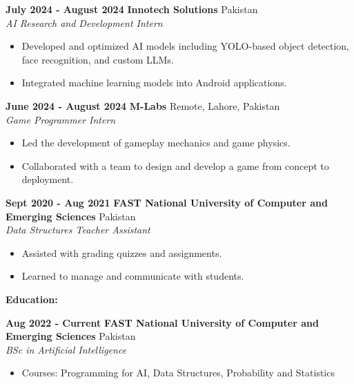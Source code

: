 \documentclass[a4paper,10pt]{article}
\begin{document}
\textbf{July 2024 - August 2024} \hfill \textbf{Innotech Solutions} \hfill Pakistan\\
\textit{AI Research and Development Intern}
\begin{itemize}
    \item Developed and optimized AI models including YOLO-based object detection, face recognition, and custom LLMs.
    \item Integrated machine learning models into Android applications.
\end{itemize}

\vspace{5pt}

\textbf{June 2024 - August 2024} \hfill \textbf{M-Labs} \hfill Remote, Lahore, Pakistan\\
\textit{Game Programmer Intern}
\begin{itemize}
    \item Led the development of gameplay mechanics and game physics.
    \item Collaborated with a team to design and develop a game from concept to deployment.
\end{itemize}

\vspace{5pt}

\textbf{Sept 2020 - Aug 2021} \hfill \textbf{FAST National University of Computer and Emerging Sciences} \hfill Pakistan\\
\textit{Data Structures Teacher Assistant}
\begin{itemize}
    \item Assisted with grading quizzes and assignments.
    \item Learned to manage and communicate with students.
\end{itemize}

\vspace{5pt}

\textbf{Education:}

\vspace{5pt}

\textbf{Aug 2022 - Current} \hfill \textbf{FAST National University of Computer and Emerging Sciences} \hfill Pakistan\\
\textit{BSc in Artificial Intelligence}
\begin{itemize}
    \item Courses: Programming for AI, Data Structures, Probability and Statistics
\end{itemize}
\end{document}
